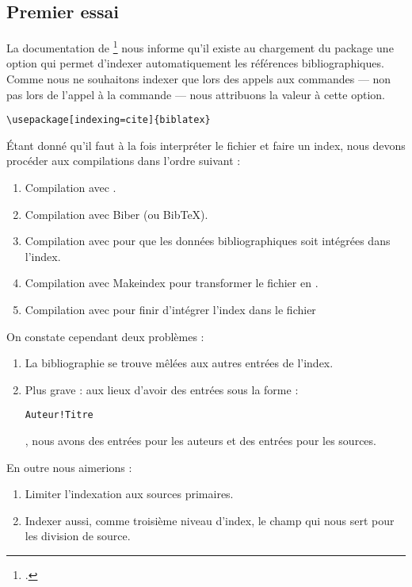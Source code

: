 {\subsection{Premier essai}

La documentation de \footcite{biblatex_options} nous informe qu'il existe  au chargement du package une option  qui permet d'indexer automatiquement les références bibliographiques. Comme nous ne souhaitons indexer que lors des appels aux commandes   ---  non pas lors de l'appel à la commande  --- nous attribuons la valeur  à cette option. 

\begin{verbatim}
\usepackage[indexing=cite]{biblatex}
\end{verbatim}

Étant donné qu'il faut à la fois interpréter le fichier  et faire un index, nous devons procéder aux compilations dans l'ordre suivant :

\begin{enumerate}
\item Compilation avec \XeLaTeX.
\item Compilation avec Biber (ou BibTeX).
\item Compilation avec \XeLaTeX pour que les données bibliographiques soit intégrées dans l'index.
\item Compilation avec Makeindex pour transformer le fichier  en .
\item Compilation avec \XeLaTeX pour finir d'intégrer l'index dans le fichier 
\end{enumerate}

On constate cependant deux problèmes : 
\begin{enumerate}
\item La bibliographie se trouve mêlées aux autres entrées de l'index.
\item Plus grave : aux lieux d'avoir des entrées sous la forme : \begin{english}\verb|Auteur!Titre|\end{english}, nous avons des entrées pour les auteurs et des entrées pour les sources.
\end{enumerate}

En outre nous aimerions :
\begin{enumerate}
\item Limiter l'indexation aux sources primaires.
\item Indexer aussi, comme troisième niveau d'index, le champ  qui nous sert pour les division de source. 
\end{enumerate}

}
